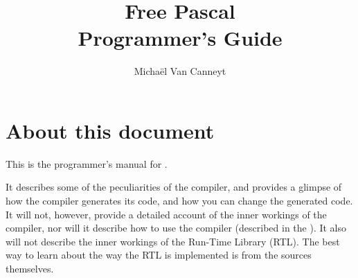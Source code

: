 %
%
%
%
%

\begin{latexonly}
  \ifpdf
  \fi
\end{latexonly}

%
%
\makeindex
{}
%
%

\title{Free Pascal \\ Programmer's Guide}

\author{Micha\"el Van Canneyt}
\maketitle
\tableofcontents
\newpage
\listoftables
\newpage

\section*{About this document}
This is the programmer's manual for \fpc.

It describes some of the peculiarities of the \fpc compiler, and provides a
glimpse of how the compiler generates its code, and how you can change the
generated code. It will not, however, provide a detailed account of
the inner workings of the compiler, nor will it describe how to use the
compiler (described in the \userref). It also will not describe the inner
workings of the Run-Time Library (RTL). The best way to learn about the way
the RTL is implemented is from the sources themselves.

